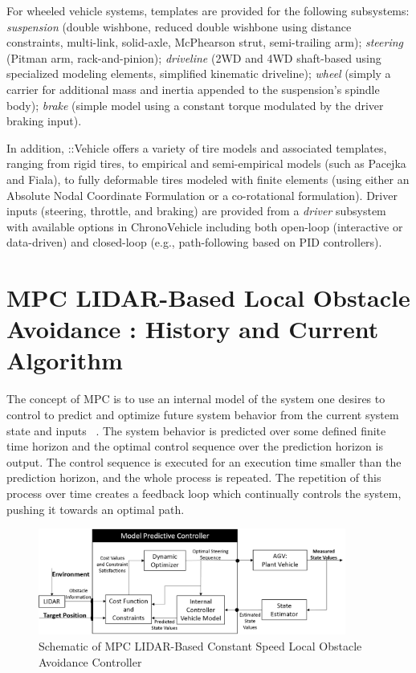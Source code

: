 \documentclass[12pt,onecolumn]{report}
\newcommand{\CHRONO}{{\sffamily{{Chrono}}}}
\newcommand{\ChronoVehicle}{{\sffamily{Chrono}}::Vehicle}
\begin{document}
For wheeled vehicle systems, templates are provided for the following subsystems:
{\em suspension} (double wishbone, reduced double wishbone using distance constraints, multi-link, solid-axle, McPhearson strut, semi-trailing arm);
{\em steering} (Pitman arm, rack-and-pinion);
{\em driveline} (2WD and 4WD shaft-based using specialized {\CHRONO} modeling elements, simplified kinematic driveline);
{\em wheel} (simply a carrier for additional mass and inertia appended to the suspension's spindle body);
{\em brake} (simple model using a constant torque modulated by the driver braking input).

In addition, {\ChronoVehicle} offers a variety of tire models and associated templates, ranging from rigid tires, to empirical and semi-empirical models (such as Pacejka and Fiala), to fully deformable tires modeled with finite elements (using either an Absolute Nodal Coordinate Formulation or a co-rotational formulation).  Driver inputs (steering, throttle, and braking) are provided from a {\em driver} subsystem with available options in {ChronoVehicle} including both open-loop (interactive or data-driven) and closed-loop (e.g., path-following based on PID controllers).


\section{MPC LIDAR-Based Local Obstacle Avoidance : History and Current Algorithm}\label{s:MPC}

The concept of MPC is to use an internal model of the system one desires to control to predict and optimize future system behavior from the current system state and inputs ~\cite{Allgower&Findeisen2002}. The system behavior is predicted over some defined finite time horizon and the optimal control sequence over the prediction horizon is output. The control sequence is executed for an execution time smaller than the prediction horizon, and the whole process is repeated. The repetition of this process over time creates a feedback loop which continually controls the system, pushing it towards an optimal path.

\begin{figure}
	\centering
	\includegraphics[width=0.9\textwidth]{Figs/MPCBlockDiagram.png}
	\caption{{\small Schematic of MPC LIDAR-Based Constant Speed Local Obstacle Avoidance Controller}}    
	\label{fig:MPC_schematic}
\end{figure}
\end{document}
